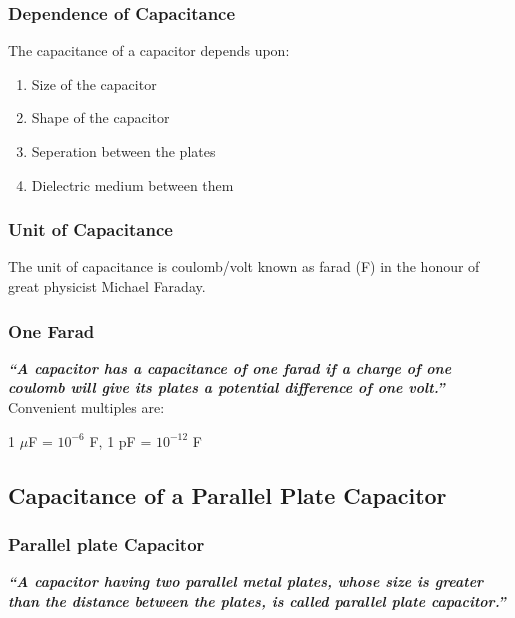\subsubsection*{Dependence of Capacitance}
The capacitance of a capacitor depends upon:
\begin{enumerate}[label = (\roman*)]
\item Size of the capacitor
\item Shape of the capacitor
\item Seperation between the plates 
\item Dielectric medium between them 
\end{enumerate}
\subsubsection{Unit of Capacitance}
The unit of capacitance is coulomb/volt known as farad (F)
in the honour of great physicist Michael Faraday.
\subsubsection{One Farad}
\textit{
  \textbf{“A capacitor has a capacitance of one farad if a charge of one coulomb
will give its plates a potential difference of one volt.”}}
Convenient multiples are:
\begin{center}
  1 $\mu$F = $10^{-6}$ F, 1 pF = $10^{-12}$ F 
\end{center}
\subsection{Capacitance of a Parallel Plate Capacitor}
\subsubsection{Parallel plate Capacitor}
\textit{\textbf{“A capacitor having two parallel metal plates,
whose size is greater than the distance between the plates,
is called parallel plate capacitor.”}}

